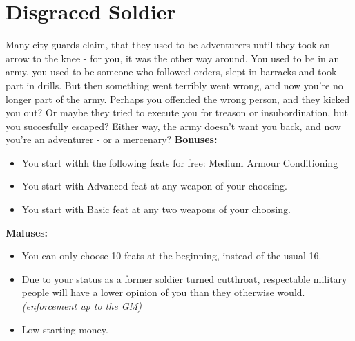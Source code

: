 \section{Disgraced Soldier}
Many city guards claim, that they used to be adventurers until they took an arrow to the knee - for you, it was the other way around. You used to be in an army, you used to be someone who followed orders, slept in barracks and took part in drills. But then something went terribly went wrong, and now you're no longer part of the army. Perhaps you offended the wrong person, and they kicked you out? Or maybe they tried to execute you for treason or insubordination, but you succesfully escaped? Either way, the army doesn't want you back, and now you're an adventurer - or a mercenary? \newline
\textbf{Bonuses:}
\begin{itemize}
	\item You start withh the following feats for free: Medium Armour Conditioning
	\item You start with Advanced feat at any weapon of your choosing.
	\item You start with Basic feat at any two weapons of your choosing.
\end{itemize}
\textbf{Maluses:}
\begin{itemize}
	\item You can only choose 10 feats at the beginning, instead of the usual 16.
	\item Due to your status as a former soldier turned cutthroat, respectable military people will have a lower opinion of you than they otherwise would. \textit{(enforcement up to the GM)}
	\item Low starting money.
\end{itemize}
